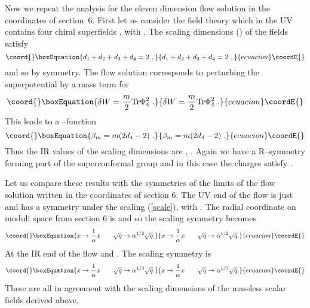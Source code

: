 \documentclass[a4paper,12pt]{article}
\providecommand{\reef}[1]{(\ref{#1})}
\begin{document}
Now we repeat the analysis for the eleven dimension flow solution in
the coordinates of section~6. First let us consider the field theory
which in the UV contains four chiral superfields \coordHE{}, with \coordHE{}. The scaling dimensions (\coordHE{}) of the fields satisfy
\begin{equation}\coord{}\boxEquation{
  d_1 + d_2 + d_3 + d_4 = 2\ ,
}{
  d_1 + d_2 + d_3 + d_4 = 2\ ,
}{ecuacion}\coordE{}\end{equation}
and so \coordHE{} by symmetry.  The flow solution corresponds
to perturbing the superpotential by a mass term for \coordHE{}
\begin{equation}\coord{}\boxEquation{
 \delta W = {m \over 2} \mbox{Tr} \Phi_4 ^2\ .
}{
 \delta W = {m \over 2} \mbox{Tr} \Phi_4 ^2\ .
}{ecuacion}\coordE{}\end{equation}
This leads to a \myHighlight{$\beta$}\coordHE{}--function 
\begin{equation}\coord{}\boxEquation{
 \beta_{m} = m (2 d_4 - 2)\ . 
}{
 \beta_{m} = m (2 d_4 - 2)\ . 
}{ecuacion}\coordE{}\end{equation}
Thus the IR values of the scaling dimensions are \coordHE{},
\coordHE{}. Again we have a \coordHE{} R--symmetry forming
part of the superconformal group and in this case the charges satisfy
\coordHE{}.

Let us compare these results with the symmetries of the limits of the
flow solution written in the coordinates of section 6. The UV end of
the flow is just \coordHE{} and has a symmetry under the
scaling \reef{scale}, with \coordHE{}. The radial coordinate
on moduli space from section 6 is \coordHE{} and so the scaling symmetry becomes
\begin{equation}\coord{}\boxEquation{
 x \rightarrow {1 \over \alpha} x \qquad \sqrt{q} \rightarrow \alpha^{{1/2}} \sqrt{q} .
}{
 x \rightarrow {1 \over \alpha} x \qquad \sqrt{q} \rightarrow \alpha^{{1/2}} \sqrt{q} .
}{ecuacion}\coordE{}\end{equation}
At the IR end of the flow \coordHE{} and \coordHE{}. The scaling
symmetry is
\begin{equation}\coord{}\boxEquation{
 x \rightarrow {1 \over \alpha} x \qquad \sqrt{q} \rightarrow \alpha^{{1/3}} \sqrt{q} .
}{
 x \rightarrow {1 \over \alpha} x \qquad \sqrt{q} \rightarrow \alpha^{{1/3}} \sqrt{q} .
}{ecuacion}\coordE{}\end{equation}
These are all in agreement with the scaling dimensions of the massless
scalar fields derived above.
\end{document}
